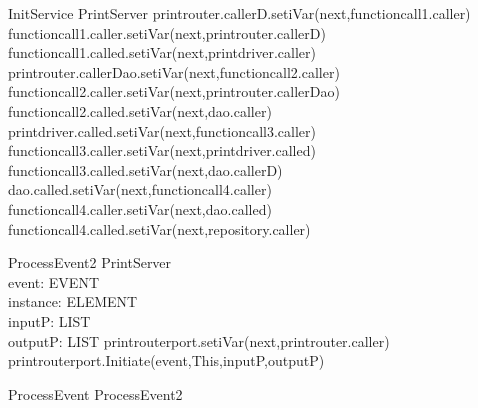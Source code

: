 \begin{schema}{InitService}
\Delta PrintServer
\where
printrouter.callerD.setiVar(next,functioncall1.caller) \\
functioncall1.caller.setiVar(next,printrouter.callerD) \\
functioncall1.called.setiVar(next,printdriver.caller) \\

printrouter.callerDao.setiVar(next,functioncall2.caller) \\
functioncall2.caller.setiVar(next,printrouter.callerDao) \\
functioncall2.called.setiVar(next,dao.caller) \\

printdriver.called.setiVar(next,functioncall3.caller) \\
functioncall3.caller.setiVar(next,printdriver.called) \\
functioncall3.called.setiVar(next,dao.callerD) \\

dao.called.setiVar(next,functioncall4.caller) \\
functioncall4.caller.setiVar(next,dao.called) \\
functioncall4.called.setiVar(next,repository.caller)
\end{schema}



\begin{schema}{ProcessEvent2}
\Delta PrintServer \\
event: EVENT \\
instance: ELEMENT \\
inputP: LIST \\
outputP: LIST
\where
printrouterport.setiVar(next,printrouter.caller) \\
printrouterport.Initiate(event,This,inputP,outputP)
\end{schema}

\begin{zed} ProcessEvent \sdef  ProcessEvent2  \end{zed}

